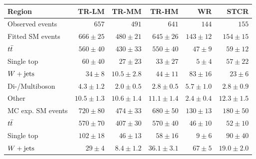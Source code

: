 

\begin{table}
\begin{center}
{\small
\begin{tabular}{lrrrrr}
\toprule
Region           & TR-LM            & TR-MM            & TR-HM            & WR            & STCR              \\[-0.05cm]
\midrule
Observed events          & $657$              & $491$              & $641$              & $144$              & $155$                    \\
\midrule
Fitted SM events         & $666 \pm 25$          & $480 \pm 21$          & $645 \pm 26$          & $143 \pm 12$          & $154 \pm 15$              \\
\noalign{\smallskip}\hline\noalign{\smallskip}
        $t\bar{t}$         & $560 \pm 40$          & $430 \pm 33$          & $550 \pm 40$          & $47 \pm 9$          & $59 \pm 12$              \\
        Single top         & $60 \pm 40$          & $27 \pm 23$          & $33 \pm 27$          & $5 \pm 4$          & $57 \pm 22$              \\
        $W+\mathrm{jets}$         & $34 \pm 8$          & $10.5 \pm 2.8$          & $44 \pm 11$          & $83 \pm 16$          & $23 \pm 6$              \\
        Di-/Multiboson        & $4.3 \pm 1.2$          & $2.0 \pm 0.5$          & $2.8 \pm 0.5$          & $5.7 \pm 1.0$          & $2.8 \pm 0.9$              \\
        Other       & $10.5 \pm 1.3$          & $10.6 \pm 1.4$          & $11.1 \pm 1.4$          & $2.4 \pm 0.4$          & $12.3 \pm 1.5$              \\
\toprule
MC exp. SM events              & $720 \pm 80$          & $474 \pm 33$          & $680 \pm 50$          & $130 \pm 13$          & $180 \pm 50$              \\
\midrule
        $t\bar{t}$        & $570 \pm 70$          & $407 \pm 30$          & $570 \pm 40$          & $46 \pm 10$          & $52 \pm 10$              \\
        Single top         & $102 \pm 18$          & $46 \pm 13$          & $58 \pm 16$          & $9 \pm 6$          & $90 \pm 40$              \\
        $W+\mathrm{jets}$         & $29 \pm 4$          & $8.4 \pm 1.2$          & $36.1 \pm 3.1$          & $67 \pm 5$          & $19.0 \pm 2.0$              \\

\end{tabular}}
\end{center}
\end{table}

